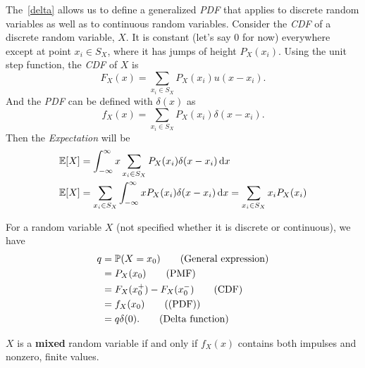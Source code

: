 \begin{corollary}
    The~\cref{delta} allows us to define a generalized \emph{PDF} that applies to discrete random variables as well as to continuous random variables. Consider the \emph{CDF} of a discrete random variable, $X$. It is constant (let's say $0$ for now) everywhere except at point $x_i\in S_X$, where it has jumps of height $P_X(x_i)$. Using the unit step function, the \emph{CDF} of $X$ is
    \[F_X(x)=\sum_{x_i\in S_X} P_X(x_i)u(x-x_i).\]
    And the \emph{PDF} can be defined with $\delta(x)$ as
    \[f_X(x)=\sum_{x_i\in S_X}P_X(x_i)\delta(x-x_i).\]
    Then the \emph{Expectation} will be
    \begin{align*}
        \E{X} &= \int_{-\infty}^{\infty}x\sum_{x_i\in S_X}P_X(x_i)\delta(x-x_i)\diff x \\
        \E{X} &= \sum_{x_i\in S_X}\int_{-\infty}^{\infty}xP_X(x_i)\delta(x-x_i)\diff x = \sum_{x_i\in S_X}x_i P_X(x_i)
    \end{align*}
\end{corollary}

\begin{theorem}
    For a random variable $X$ (not specified whether it is discrete or continuous), we have
    \begin{align*}
        q
        &= \P{X=x_0}  \tag{General expression} \\
        &= P_X(x_0)  \tag{PMF} \\
        &= F_X(x_0^+) - F_X(x_0^-)  \tag{CDF} \\
        &= f_X(x_0)  \tag{(PDF)} \\
        &= q\delta(0).  \tag{Delta function}
    \end{align*}
\end{theorem}

\begin{theorem}
    $X$ is a \textbf{mixed} random variable if and only if $f_X(x)$ contains both impulses and nonzero, finite values.
\end{theorem}